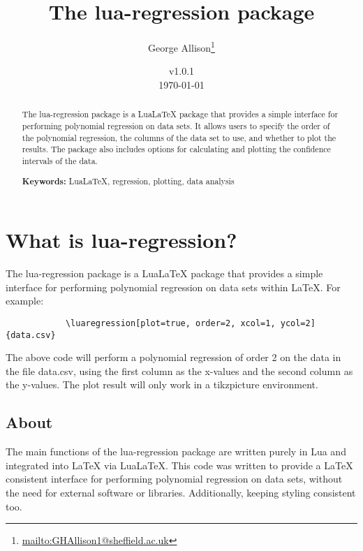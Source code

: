 \documentclass[11pt]{article}
\title{The {\ttfamily lua-regression} package}
\author{George Allison\thanks{\href{mailto:GHAllison1@sheffield.ac.uk}{\ttfamily mailto:GHAllison1@sheffield.ac.uk}}}
\date{v1.0.1\\ \today}
\begin{document}
    \maketitle
    
    \begin{abstract}
        The {\ttfamily lua-regression} package is a Lua\LaTeX{} package that provides a simple interface for performing polynomial regression on data sets.
        It allows users to specify the order of the polynomial regression, the columns of the data set to use, and whether to plot the results.
        The package also includes options for calculating and plotting the confidence intervals of the data.

        \vspace{1em}
        
        \textbf{Keywords:} LuaLaTeX, regression, plotting, data analysis
    \end{abstract}

    \tableofcontents

    \pagebreak

    \section{What is {\ttfamily lua-regression}?}

    The {\ttfamily lua-regression} package is a Lua\LaTeX{} package that provides a simple interface for performing polynomial regression on data sets within \LaTeX{}. For example:

	\begin{codebox}
		\begin{verbatim}
			\luaregression[plot=true, order=2, xcol=1, ycol=2]{data.csv}
		\end{verbatim}
	\end{codebox}

    
    The above code will perform a polynomial regression of order 2 on the data in the file {\ttfamily data.csv}, using the first column as the x-values and the second column as the y-values.
    The plot result will only work in a tikzpicture environment.


    \subsection{About}

    The main functions of the {\ttfamily lua-regression} package are written purely in Lua and integrated into \LaTeX{} via Lua\LaTeX{}.
    This code was written to provide a \LaTeX{} consistent interface for performing polynomial regression on data sets, without the need for external software or libraries.
    Additionally, keeping styling consistent too.
    
\end{document}
